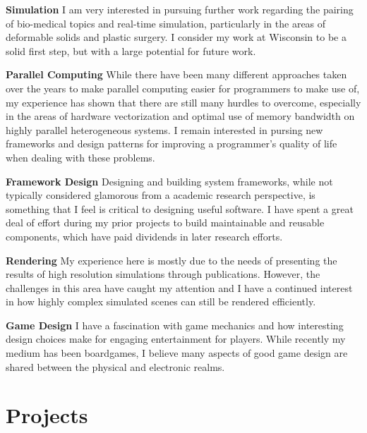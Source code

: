 \documentclass{cv-style}     %
\begin{document}
  \textbf{Simulation} I am very interested in
  pursuing further work regarding the pairing of
  bio-medical topics and real-time simulation,
  particularly in the areas of deformable solids
  and plastic surgery. I consider my work at
  Wisconsin to be a solid first step, but with a
  large potential for future work.

  \textbf{Parallel Computing} While there have
  been many different approaches taken over the
  years to make parallel computing easier for
  programmers to make use of, my experience has
  shown that there are still many hurdles to
  overcome, especially in the areas of hardware
  vectorization and optimal use of memory
  bandwidth on highly parallel heterogeneous
  systems. I remain interested in pursing new
  frameworks and design patterns for improving
  a programmer's quality of life when dealing with
  these problems.

  \textbf{Framework Design} Designing and building
  system frameworks, while not typically
  considered glamorous from a academic research
  perspective, is something that I feel is
  critical to designing useful software. I have
  spent a great deal of effort during my prior
  projects to build maintainable and reusable
  components, which have paid dividends in later
  research efforts.

  \textbf{Rendering} My experience here is mostly
  due to the needs of presenting the results of
  high resolution simulations through
  publications. However, the challenges in this area
  have caught my attention and I have a continued
  interest in how highly complex simulated scenes
  can still be rendered efficiently.

  \textbf{Game Design} I have a fascination with
  game mechanics and how interesting design
  choices make for engaging entertainment for
  players. While recently my medium has been
  boardgames, I believe many aspects of good game
  design are shared between the physical and
  electronic realms.

\section{Projects}
\vspace{-0.2cm}
\end{document}
